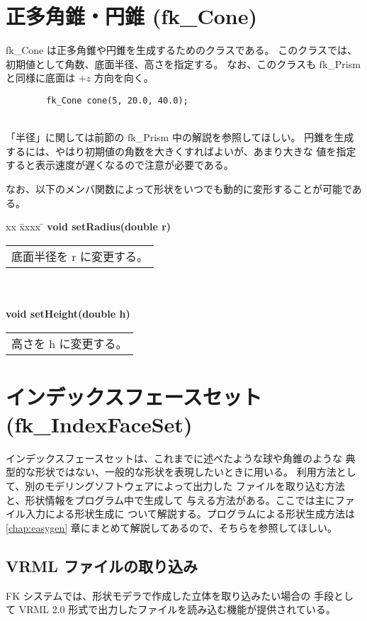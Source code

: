 \section{正多角錐・円錐 (fk\_Cone)}
fk\_Cone は正多角錐や円錐を生成するためのクラスである。
このクラスでは、初期値として角数、底面半径、高さを指定する。
なお、このクラスも fk\_Prism と同様に底面は \(+z\) 方向を向く。
\\
\begin{screen}
\begin{verbatim}
        fk_Cone cone(5, 20.0, 40.0);
\end{verbatim}
\end{screen}
~ \\
「半径」に関しては前節の fk\_Prism 中の解説を参照してほしい。
円錐を生成するには、やはり初期値の角数を大きくすればよいが、あまり大きな
値を指定すると表示速度が遅くなるので注意が必要である。

なお、以下のメンバ関数によって形状をいつでも動的に変形することが可能である。

\begin{tabbing}
xx \= xxxx \= \kill
\> \textbf{void setRadius(double r)} \\
	\> \> \begin{tabular}{p{15cm}}
		底面半径を r に変更する。
	\end{tabular} \\ \\

\> \textbf{void setHeight(double h)} \\
	\> \> \begin{tabular}{p{15cm}}
		高さを h に変更する。
	\end{tabular}
\end{tabbing}

\section{インデックスフェースセット (fk\_IndexFaceSet)}
インデックスフェースセットは、これまでに述べたような球や角錐のような
典型的な形状ではない、一般的な形状を表現したいときに用いる。
利用方法として、別のモデリングソフトウェアによって出力した
ファイルを取り込む方法と、形状情報をプログラム中で生成して
与える方法がある。ここでは主にファイル入力による形状生成に
ついて解説する。プログラムによる形状生成方法は
\ref{chap:easygen} 章にまとめて解説してあるので、そちらを参照してほしい。

\subsection{VRML ファイルの取り込み}
FK システムでは、形状モデラで作成した立体を取り込みたい場合の
手段として VRML 2.0 形式で出力したファイルを読み込む機能が提供されている。

